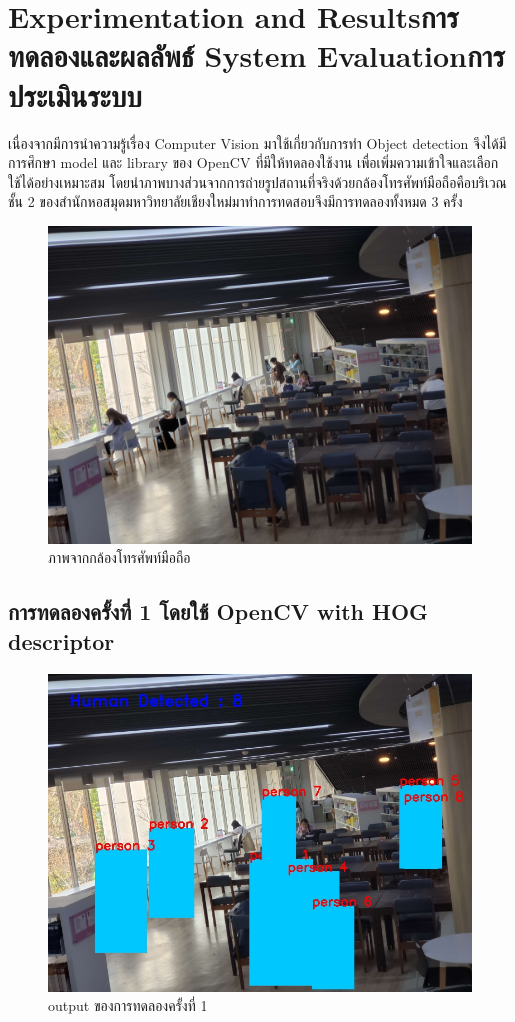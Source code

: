\chapter{\ifproject%
\ifenglish Experimentation and Results\else การทดลองและผลลัพธ์\fi
\else%
\ifenglish System Evaluation\else การประเมินระบบ\fi
\fi}
\hspace{10mm} เนื่องจากมีการนำความรู้เรื่อง Computer Vision มาใช้เกี่ยวกับการทำ Object detection จึงได้มีการศึกษา model และ library
ของ OpenCV ที่มีให้ทดลองใช้งาน เพื่อเพิ่มความเข้าใจและเลือกใช้ได้อย่างเหมาะสม โดยนำภาพบางส่วนจากการถ่ายรูปสถานที่จริงด้วยกล้องโทรศัพท์มือถือคือบริเวณชั้น 2
ของสำนักหอสมุดมหาวิทยาลัยเชียงใหม่มาทำการทดสอบจึงมีการทดลองทั้งหมด 3 ครั้ง
\begin{figure}[ht]
    \centering
    \includegraphics[scale=0.07]{images/cam2-2.jpg}
    \caption[camera]{ภาพจากกล้องโทรศัพท์มือถือ}
    \label{fig:camera}
\end{figure}
\newpage
\section{การทดลองครั้งที่ 1 โดยใช้ OpenCV with HOG descriptor}
\begin{figure}[ht]
\centering
\includegraphics[scale=0.35]{images/hog_output.jpg}
\caption[output1]{output ของการทดลองครั้งที่ 1}
\label{fig:output1}
\end{figure}

